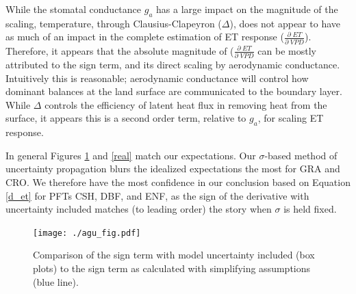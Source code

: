 \documentclass[draft,linenumbers]{gcbjournal}
\begin{document}
While the stomatal conductance $g_a$ has a large impact on the magnitude of the scaling, temperature, through Clausius-Clapeyron ($\Delta$), does not appear to have as much of an impact in the complete estimation of ET response ($\frac{\partial \; ET}{\partial \; VPD}$). Therefore, it appears that the absolute magnitude of ($\frac{\partial \; ET}{\partial \; VPD}$ can be mostly attributed to the sign term, and its direct scaling by aerodynamic conductance. Intuitively this is reasonable; aerodynamic conductance will control how dominant balances at the land surface are communicated to the boundary layer. While $\Delta$ controls the efficiency of latent heat flux in removing heat from the surface, it appears this is a second order term, relative to $g_a$, for scaling ET response. 

In general Figures \ref{agu_fig} and \ref{real} match our expectations. Our $\sigma$-based method of uncertainty propagation blurs the idealized expectations the most for GRA and CRO. We therefore have the most confidence in our conclusion based on Equation \ref{d_et} for PFTs CSH, DBF, and ENF, as the sign of the derivative with uncertainty included matches (to leading order) the story when $\sigma$ is held fixed.

\begin{figure}[!p]
\centering
\texttt{[image: ./agu\_fig.pdf]}
\caption{Comparison of the sign term with model uncertainty included (box plots) to the sign term as calculated with simplifying assumptions (blue line).}
\label{agu_fig}
\end{figure}
\end{document}
